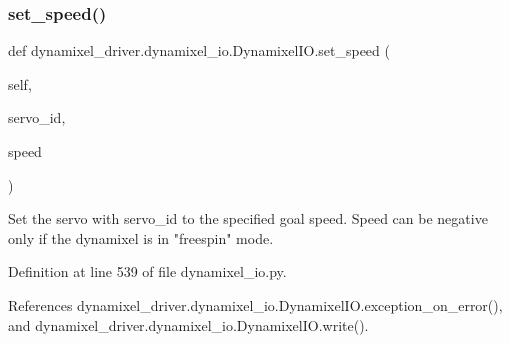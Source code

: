 \subsubsection{\texorpdfstring{set\+\_\+speed()}{set\_speed()}}
{\footnotesize\ttfamily def dynamixel\+\_\+driver.\+dynamixel\+\_\+io.\+Dynamixel\+I\+O.\+set\+\_\+speed (\begin{DoxyParamCaption}\item[{}]{self,  }\item[{}]{servo\+\_\+id,  }\item[{}]{speed }\end{DoxyParamCaption})}

\begin{DoxyVerb}Set the servo with servo_id to the specified goal speed.
Speed can be negative only if the dynamixel is in "freespin" mode.
\end{DoxyVerb}
 

Definition at line 539 of file dynamixel\+\_\+io.\+py.



References dynamixel\+\_\+driver.\+dynamixel\+\_\+io.\+Dynamixel\+I\+O.\+exception\+\_\+on\+\_\+error(), and dynamixel\+\_\+driver.\+dynamixel\+\_\+io.\+Dynamixel\+I\+O.\+write().


